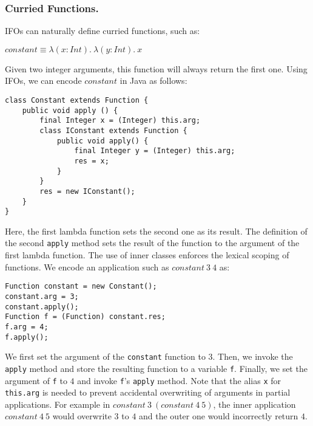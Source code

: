 \subsubsection{Curried Functions.} IFOs can naturally define
curried functions, such as:

\vspace{5pt}
$constant \equiv \lambda (x : Int) .~\lambda (y : Int) .~x$
\vspace{5pt}

\noindent Given two integer arguments, this function will always return
the first one. Using IFOs, we can encode $constant$ in Java as follows:

\begin{lstlisting}
class Constant extends Function {
    public void apply () {
        final Integer x = (Integer) this.arg;
        class IConstant extends Function {
            public void apply() {
                final Integer y = (Integer) this.arg;
                res = x;
            }
        }
        res = new IConstant();
    }
}
\end{lstlisting}

\noindent Here, the first lambda function sets the second one as its result.
The definition of the second \lstinline{apply} method
sets the result of the function to the argument of the first lambda
function. The use of inner classes enforces the lexical scoping of functions.
 We encode an application such as $constant~3~4$ as:

\begin{lstlisting}
Function constant = new Constant();
constant.arg = 3;
constant.apply();
Function f = (Function) constant.res;
f.arg = 4;
f.apply();
\end{lstlisting}

\noindent We first set the argument of the \lstinline{constant} function to $3$. Then,
we invoke the \lstinline{apply} method and store the
resulting function to a variable \lstinline{f}. Finally, we set the
argument of \lstinline{f} to $4$ and invoke \lstinline{f}'s
\lstinline{apply} method.
Note that the alias \lstinline{x} for \lstinline{this.arg} is needed to prevent accidental
overwriting of arguments in partial applications. For example in
$constant~3~(constant~4~5)$, the inner application $constant~4~5$ would overwrite
$3$ to $4$ and the outer one would incorrectly return $4$.

